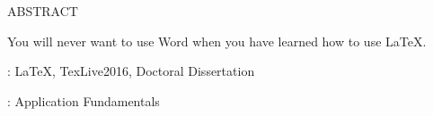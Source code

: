 \noindent\parbox[c][15mm][c]{\textwidth}{\centering\sanhao ABSTRACT}

\noindent You will never want to use Word when you have learned how to use \LaTeX.

\vspace{\baselineskip}
{ \hangindent=69.6pt
	: \LaTeX, TexLive2016, Doctoral Dissertation

	\vspace{\baselineskip}
	: Application Fundamentals
}

\clearpage
